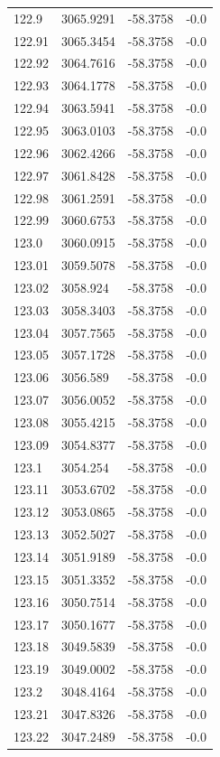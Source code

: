 \begin{table}[H]
\begin{tabular}{llll}
122.9 & 3065.9291 & -58.3758 & -0.0 \\
122.91 & 3065.3454 & -58.3758 & -0.0 \\
122.92 & 3064.7616 & -58.3758 & -0.0 \\
122.93 & 3064.1778 & -58.3758 & -0.0 \\
122.94 & 3063.5941 & -58.3758 & -0.0 \\
122.95 & 3063.0103 & -58.3758 & -0.0 \\
122.96 & 3062.4266 & -58.3758 & -0.0 \\
122.97 & 3061.8428 & -58.3758 & -0.0 \\
122.98 & 3061.2591 & -58.3758 & -0.0 \\
122.99 & 3060.6753 & -58.3758 & -0.0 \\
123.0 & 3060.0915 & -58.3758 & -0.0 \\
123.01 & 3059.5078 & -58.3758 & -0.0 \\
123.02 & 3058.924 & -58.3758 & -0.0 \\
123.03 & 3058.3403 & -58.3758 & -0.0 \\
123.04 & 3057.7565 & -58.3758 & -0.0 \\
123.05 & 3057.1728 & -58.3758 & -0.0 \\
123.06 & 3056.589 & -58.3758 & -0.0 \\
123.07 & 3056.0052 & -58.3758 & -0.0 \\
123.08 & 3055.4215 & -58.3758 & -0.0 \\
123.09 & 3054.8377 & -58.3758 & -0.0 \\
123.1 & 3054.254 & -58.3758 & -0.0 \\
123.11 & 3053.6702 & -58.3758 & -0.0 \\
123.12 & 3053.0865 & -58.3758 & -0.0 \\
123.13 & 3052.5027 & -58.3758 & -0.0 \\
123.14 & 3051.9189 & -58.3758 & -0.0 \\
123.15 & 3051.3352 & -58.3758 & -0.0 \\
123.16 & 3050.7514 & -58.3758 & -0.0 \\
123.17 & 3050.1677 & -58.3758 & -0.0 \\
123.18 & 3049.5839 & -58.3758 & -0.0 \\
123.19 & 3049.0002 & -58.3758 & -0.0 \\
123.2 & 3048.4164 & -58.3758 & -0.0 \\
123.21 & 3047.8326 & -58.3758 & -0.0 \\
123.22 & 3047.2489 & -58.3758 & -0.0 \\

\end{tabular}
\end{table}
